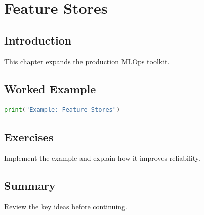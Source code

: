 \chapter{Feature Stores}
\label{chap:vol10-6}



\section{Introduction}
This chapter expands the production MLOps toolkit.

\section{Worked Example}
\begin{lstlisting}[language=Python]
print("Example: Feature Stores")
\end{lstlisting}

\section{Exercises}
\begin{exercise}
Implement the example and explain how it improves reliability.
\end{exercise}

\section{Summary}
Review the key ideas before continuing.
